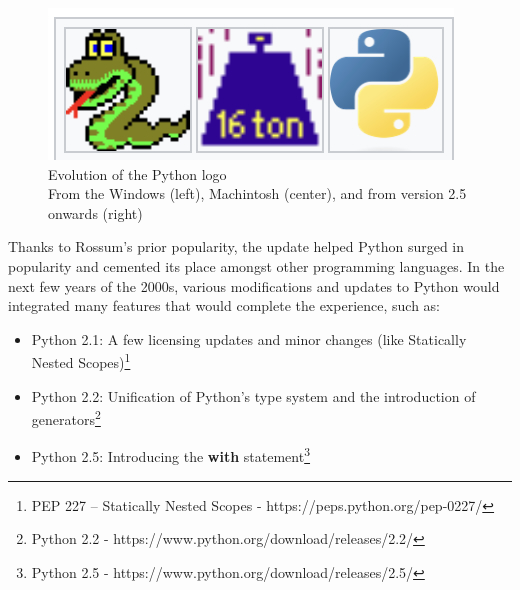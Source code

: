 \documentclass[twoside,final]{hcmut-report}
\begin{document}
\begin{figure}[ht]
\centering
\includegraphics[width=\textwidth]{graphics/logo}
\caption{Evolution of the Python logo\\ From the Windows (left),  Machintosh (center), and from version 2.5 onwards (right)}
\end{figure}

Thanks to Rossum's prior popularity, the update helped Python surged in popularity and cemented its place amongst other programming languages. In the next few years of the 2000s, various modifications and updates to Python would integrated many features that would complete the experience, such as:
\begin{itemize}

\item Python 2.1: A few licensing updates and minor changes (like Statically Nested Scopes)\footnote{PEP 227 – Statically Nested Scopes - https://peps.python.org/pep-0227/}
\item Python 2.2: Unification of Python's type system and the introduction of generators\footnote{Python 2.2 - https://www.python.org/download/releases/2.2/}
\item Python 2.5: Introducing the \textbf{with} statement\footnote{Python 2.5 - https://www.python.org/download/releases/2.5/}

\end{itemize}
\end{document}
